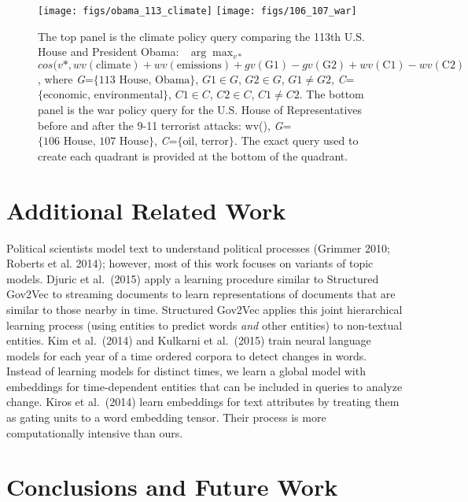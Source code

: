 \documentclass[11pt,letterpaper]{article}
\begin{document}
\begin{figure}[t]
\texttt{[image: figs/obama\_113\_climate]}
\texttt{[image: figs/106\_107\_war]}
\caption{The top panel is the climate policy query comparing the 113th U.S. House and President Obama: ~\(\arg\max_{v*}\) \(cos(v*, wv(\text{climate}) + wv(\text{emissions}) + gv(\text{G1}) - gv(\text{G2}) + wv(\text{C1}) - wv(\text{C2})\), where \emph{G}=\(\{\text{113 House, Obama}\}\), \(G1 \in G\), \(G2 \in G\), \(G1 \neq G2\), \emph{C}=\(\{\text{economic, environmental}\}\), \(C1 \in C\), \(C2 \in C\), \(C1 \neq C2\). The bottom panel is the war policy query for the U.S. House of Representatives before and after the 9-11 terrorist attacks: wv(), \emph{G}=\(\{\text{106 House, 107 House}\}\), \emph{C}=\(\{\text{oil, terror}\}\). The exact query used to create each quadrant is provided at the bottom of the quadrant.}
\end{figure}

\section{Additional Related Work}\label{related-work}

Political scientists model text to understand political processes (Grimmer 2010; Roberts et al. 2014); however, most of this work focuses on variants of topic models. %
Djuric et al.~(2015) apply a learning procedure similar to Structured
Gov2Vec to streaming documents to learn representations of documents
that are similar to those nearby in time. Structured Gov2Vec applies this
joint hierarchical learning process (using entities to predict words \emph{and}
other entities) to non-textual entities. Kim et al.~(2014) and Kulkarni
et al.~(2015) train neural language models for each year of a time
ordered corpora to detect changes in words. Instead of learning models for
distinct times, we learn a global model with embeddings for
time-dependent entities that can be included in queries to
analyze change. Kiros et al.~(2014) learn embeddings for text attributes by treating them as gating units to a word embedding tensor.  Their process is more computationally intensive than ours.

\section{Conclusions and Future Work}\label{conclusions-and-future-work}
\end{document}
